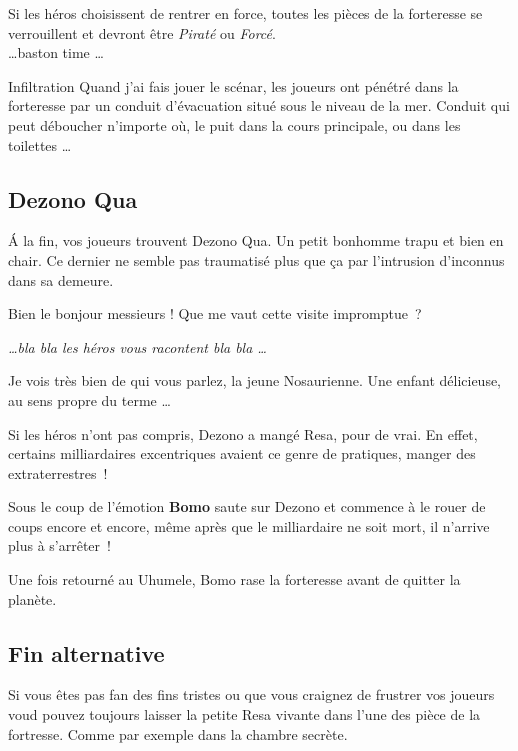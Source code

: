 \documentclass{jdrp}
\begin{document}
	Si les héros choisissent de rentrer en force, toutes les pièces de la forteresse se verrouillent et devront être \textit{Piraté} ou \textit{Forcé}.\\

	\ldots baston time \ldots \\

	\begin{paperbox}{Infiltration}
		Quand j’ai fais jouer le scénar, les joueurs ont pénétré dans la forteresse par un conduit d’évacuation situé sous le niveau de la mer. Conduit qui peut déboucher n’importe où, le puit dans la cours principale, ou dans les toilettes \ldots
	\end{paperbox}

	\subsection{Dezono Qua}
	\'A la fin, vos joueurs trouvent Dezono Qua. Un petit bonhomme trapu et bien en chair. Ce dernier ne semble pas traumatisé plus que ça par l’intrusion d’inconnus dans sa demeure.

	\begin{quotebox}
    	Bien le bonjour messieurs ! Que me vaut cette visite impromptue~?

    	\textit{\ldots bla bla les héros vous racontent bla bla \ldots}

    	Je vois très bien de qui vous parlez, la jeune Nosaurienne. Une enfant délicieuse, au sens propre du terme \ldots
	\end{quotebox}

	Si les héros n’ont pas compris, Dezono a mangé Resa, pour de vrai. En effet, certains milliardaires excentriques avaient ce genre de pratiques, manger des extraterrestres~!

	Sous le coup de l’émotion \textbf{Bomo} saute sur Dezono et commence à le rouer de coups encore et encore, même après que le milliardaire ne soit mort, il n’arrive plus à s’arrêter~!

	Une fois retourné au Uhumele, Bomo rase la forteresse avant de quitter la planète.

	\subsection{Fin alternative}
	Si vous êtes pas fan des fins tristes ou que vous craignez de frustrer vos joueurs voud pouvez toujours laisser la petite Resa vivante dans l’une des pièce de la fortresse. Comme par exemple dans la chambre secrète.
\end{document}
